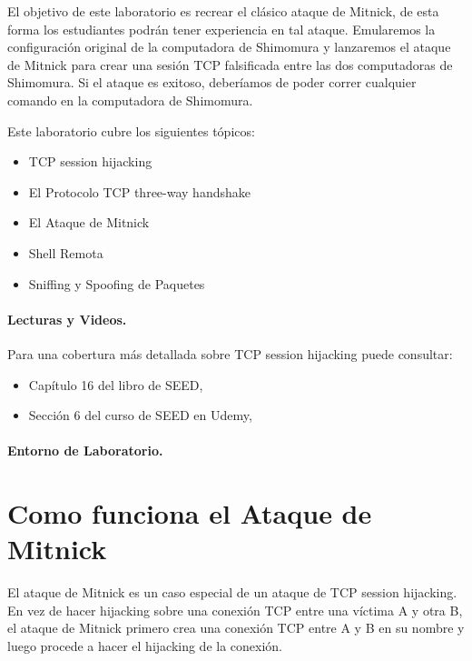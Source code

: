 El objetivo de este laboratorio es recrear el clásico ataque de Mitnick, de esta forma los estudiantes podrán tener experiencia en tal ataque.
Emularemos la configuración original de la computadora de Shimomura y lanzaremos el ataque de Mitnick para crear una sesión TCP falsificada entre las dos computadoras de Shimomura. Si el ataque es exitoso, deberíamos de poder correr cualquier comando en la computadora de Shimomura.

Este laboratorio cubre los siguientes tópicos:

\begin{itemize}[noitemsep]
\item TCP session hijacking
\item El Protocolo TCP three-way handshake 
\item El Ataque de Mitnick
\item Shell Remota \rsh
\item Sniffing y Spoofing de Paquetes
\end{itemize}


\paragraph{Lecturas y Videos.}
Para una cobertura más detallada sobre  TCP session hijacking puede consultar:

\begin{itemize}
\item Capítulo 16 del libro de SEED, \seedbook
\item Sección 6 del curso de SEED en Udemy, \seedisvideo
\end{itemize}

\paragraph{Entorno de Laboratorio.} \seedenvironmentC



\section{Como funciona el Ataque de Mitnick}

El ataque de Mitnick es un caso especial de un ataque de TCP session hijacking.
En vez de hacer hijacking sobre una conexión TCP entre una víctima A y otra B, el ataque de Mitnick primero crea una conexión TCP entre A y B en su nombre y luego procede a hacer el hijacking de la conexión.

